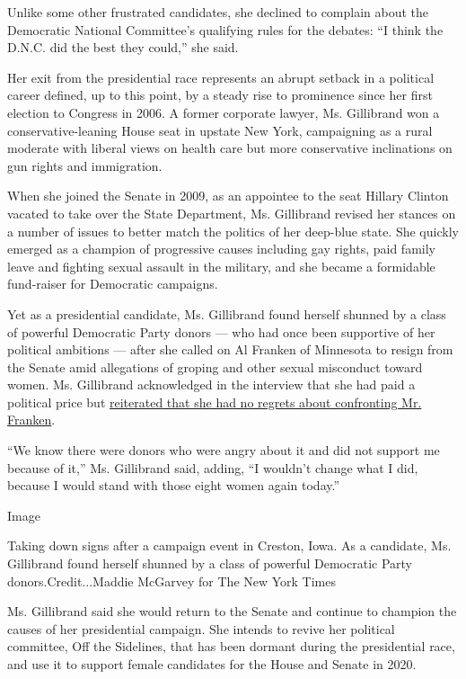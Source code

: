 Unlike some other frustrated candidates, she declined to complain about
the Democratic National Committee's qualifying rules for the debates:
``I think the D.N.C. did the best they could,'' she said.

Her exit from the presidential race represents an abrupt setback in a
political career defined, up to this point, by a steady rise to
prominence since her first election to Congress in 2006. A former
corporate lawyer, Ms. Gillibrand won a conservative-leaning House seat
in upstate New York, campaigning as a rural moderate with liberal views
on health care but more conservative inclinations on gun rights and
immigration.

When she joined the Senate in 2009, as an appointee to the seat Hillary
Clinton vacated to take over the State Department, Ms. Gillibrand
revised her stances on a number of issues to better match the politics
of her deep-blue state. She quickly emerged as a champion of progressive
causes including gay rights, paid family leave and fighting sexual
assault in the military, and she became a formidable fund-raiser for
Democratic campaigns.

Yet as a presidential candidate, Ms. Gillibrand found herself shunned by
a class of powerful Democratic Party donors --- who had once been
supportive of her political ambitions --- after she called on Al Franken
of Minnesota to resign from the Senate amid allegations of groping and
other sexual misconduct toward women. Ms. Gillibrand acknowledged in the
interview that she had paid a political price but
\href{https://www.nytimes.com/2019/07/23/us/politics/al-franken-kirsten-gillibrand.html}{reiterated
that she had no regrets about confronting Mr. Franken}.

``We know there were donors who were angry about it and did not support
me because of it,'' Ms. Gillibrand said, adding, ``I wouldn't change
what I did, because I would stand with those eight women again today.''

Image

Taking down signs after a campaign event in Creston, Iowa. As a
candidate, Ms. Gillibrand found herself shunned by a class of powerful
Democratic Party donors.Credit...Maddie McGarvey for The New York Times

Ms. Gillibrand said she would return to the Senate and continue to
champion the causes of her presidential campaign. She intends to revive
her political committee, Off the Sidelines, that has been dormant during
the presidential race, and use it to support female candidates for the
House and Senate in 2020.

